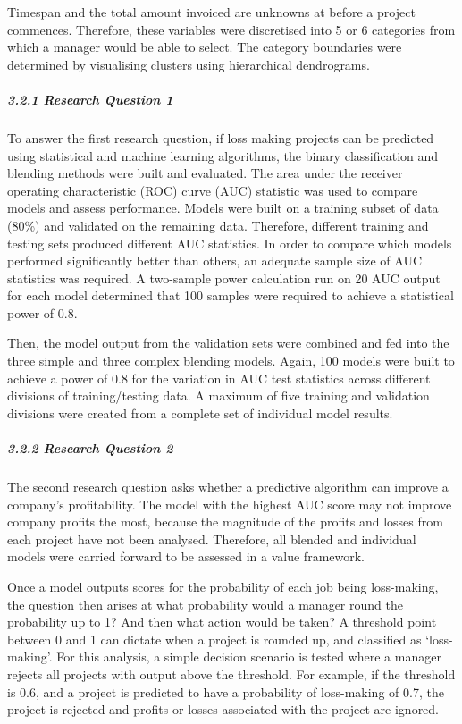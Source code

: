 \documentclass[]{elsarticle} %
\begin{document}
Timespan and the total amount invoiced are unknowns at before a project
commences. Therefore, these variables were discretised into 5 or 6
categories from which a manager would be able to select. The category
boundaries were determined by visualising clusters using hierarchical
dendrograms.

\subparagraph{3.2.1 Research Question 1}\label{research-question-1}

To answer the first research question, if loss making projects can be
predicted using statistical and machine learning algorithms, the binary
classification and blending methods were built and evaluated. The area
under the receiver operating characteristic (ROC) curve (AUC) statistic
was used to compare models and assess performance. Models were built on
a training subset of data (80\%) and validated on the remaining data.
Therefore, different training and testing sets produced different AUC
statistics. In order to compare which models performed significantly
better than others, an adequate sample size of AUC statistics was
required. A two-sample power calculation run on 20 AUC output for each
model determined that 100 samples were required to achieve a statistical
power of 0.8.

Then, the model output from the validation sets were combined and fed
into the three simple and three complex blending models. Again, 100
models were built to achieve a power of 0.8 for the variation in AUC
test statistics across different divisions of training/testing data. A
maximum of five training and validation divisions were created from a
complete set of individual model results.

\subparagraph{3.2.2 Research Question 2}\label{research-question-2}

The second research question asks whether a predictive algorithm can
improve a company's profitability. The model with the highest AUC score
may not improve company profits the most, because the magnitude of the
profits and losses from each project have not been analysed. Therefore,
all blended and individual models were carried forward to be assessed in
a value framework.

Once a model outputs scores for the probability of each job being
loss-making, the question then arises at what probability would a
manager round the probability up to 1? And then what action would be
taken? A threshold point between 0 and 1 can dictate when a project is
rounded up, and classified as `loss-making'. For this analysis, a simple
decision scenario is tested where a manager rejects all projects with
output above the threshold. For example, if the threshold is 0.6, and a
project is predicted to have a probability of loss-making of 0.7, the
project is rejected and profits or losses associated with the project
are ignored.
\end{document}
